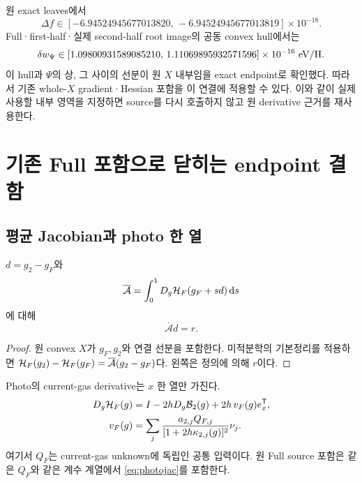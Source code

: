원 exact leaves에서
\begin{equation}
\Delta f\in[-6.94524945677013820,\,-6.94524945677013819]\times10^{-18}.
\label{eq:dfvalue}
\end{equation}
Full·first-half·실제 second-half root image의 공동 convex hull에서는
\begin{equation}
\delta w_\Psi\in[1.09800931589085210,\,
1.11069895932571596]\times10^{-16}\ {\rm eV/H}.
\label{eq:dwpsivalue}
\end{equation}
이 hull과 $\Psi$의 상, 그 사이의 선분이 원 $X$ 내부임을 exact endpoint로 확인했다.
따라서 기존 whole-$X$ gradient·Hessian 포함을 이 연결에 적용할 수 있다.
이와 같이 실제 사용할 내부 영역을 지정하면 source를 다시 호출하지 않고 원 derivative 근거를 재사용한다.\cite{bindings}

\section{기존 Full 포함으로 닫히는 endpoint 결함}\label{sec:bound}
\subsection{평균 Jacobian과 photo 한 열}
\begin{theorem}[유한 endpoint 전달]\label{thm:transfer}
$d=g_2-g_F$와
\begin{equation}
\overline{\mathcal A}
=\int_0^1D_g\mathcal H_F(g_F+s d)\,\mathrm d s
\label{eq:Abar}
\end{equation}
에 대해
\begin{equation}
\boxed{\overline{\mathcal A}d=r.}
\label{eq:mean_defect}
\end{equation}
\end{theorem}
\begin{proof}
원 convex $X$가 $g_F,g_2$와 연결 선분을 포함한다.
미적분학의 기본정리를 적용하면
$\mathcal H_F(g_2)-\mathcal H_F(g_F)=\overline{\mathcal A}(g_2-g_F)$다.
왼쪽은 정의에 의해 $r$이다.
\end{proof}

Photo의 current-gas derivative는 $x$ 한 열만 가진다.
\begin{align}
D_g\mathcal H_F(g)
&=I-2hD_g\mathcal B_2(g)+2h\,v_F(g)e_x^{\mathsf T},\label{eq:photojac}\\
v_F(g)
&=\sum_j
\frac{a_{2,j}Q_{F,j}}{[1+2h\kappa_{2,j}(g)]^2}\nu_j.
\label{eq:vf}
\end{align}
여기서 $Q_F$는 current-gas unknown에 독립인 공통 입력이다. 원 Full source 포함은 같은 $Q_F$와 같은 계수 계열에서 \eqref{eq:photojac}를 포함한다.


